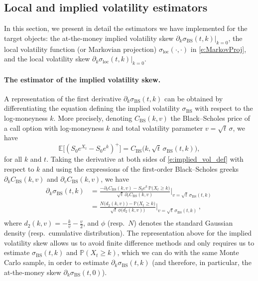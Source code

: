 \documentclass[11pt]{article}
\theoremstyle{plain}
\theoremstyle{definition}
\theoremstyle{remark}
\newcommand{\be}{\beta}
\newcommand{\1}{\mathbf{1}}
\numberwithin{equation}{section}
\def\be{\begin{equation}}
\def\ee{\end{equation}}
\def\sigDup{\sigma_\mathrm{loc}}
\def\sigBS{\sigma_\mathrm{BS}}
\begin{document}
\subsection{Local and implied volatility estimators}

In this section, we present in detail the estimators we have implemented for the target objects:  the at-the-money implied volatility skew $\partial_{k}\sigBS(t,k)|_{k=0}$, the local volatility function (or Markovian projection) $\sigDup(\cdot, \cdot)$ in \eqref{e:MarkovProj}, and the local volatility skew $\partial_{k}\sigDup(t,k)|_{k=0}$.

\paragraph{The estimator of the implied volatility skew.}
A representation of the first derivative $\partial_{k}\sigBS(t,k)$ can be obtained by differentiating the equation defining the implied volatility $\sigBS$ with respect to the log-moneyness $k$.
More precisely, denoting $C_\mathrm{BS}(k, v)$ the Black--Scholes price of a call option with log-moneyness $k$ and total volatility parameter $v = \sqrt t \, \sigma$, we have  
\be \label{e:implied_vol_def}
\mathbb E \bigl[(S_0 e^{X_t} - S_0 e^k)^+ \bigr] = C_\mathrm{BS}\bigl(k, \sqrt t \, \sigBS(t,k) \bigr) ,
\ee 
for all $k$ and $t$.
Taking the derivative at both sides of \eqref{e:implied_vol_def} with respect to $k$ and using the expressions of the first-order Black--Scholes
greeks $\partial_k C_\mathrm{BS}(k, v)$ and $\partial_v C_\mathrm{BS}(k, v)$, we have
\[
\begin{aligned}
	\partial_{k}\sigBS(t,k)
	&=  \frac{ -\partial_k C_\mathrm{BS}(k, v) - S_{0} e^k \, \mathbb{P} \bigl(X_{t}\geq k \bigr)}
	{\sqrt t \, \partial_{v} C_\mathrm{BS}(k,v)}\bigg|_{v= \sqrt t \, \sigBS(t,k)} \,
	\\
	&= \frac{N\bigl(d_2(k, v)\bigr)  - \mathbb{P} \bigl(X_{t}\geq k \bigr)}
	{\sqrt t \, \phi \bigl(d_2(k, v)\bigr)} \bigg|_{v= \sqrt t \, \sigBS(t,k)} \,,
	\\
\end{aligned}
\]
where $d_2(k, v) = -\frac k v - \frac v 2$, and $\phi$ (resp.\ $N$) denotes the standard Gaussian density (resp.\ cumulative distribution).
The representation above for the implied volatility skew allows us to avoid finite difference methods and only requires us to estimate $\sigBS(t,k)$ and $\mathbb{P}(X_t \geq k)$, which we can do with the same Monte Carlo sample, in order to estimate $\partial_{k}\sigBS(t,k)$ (and therefore, in particular, the at-the-money skew $\partial_{k}\sigBS(t,0)$).
\end{document}
